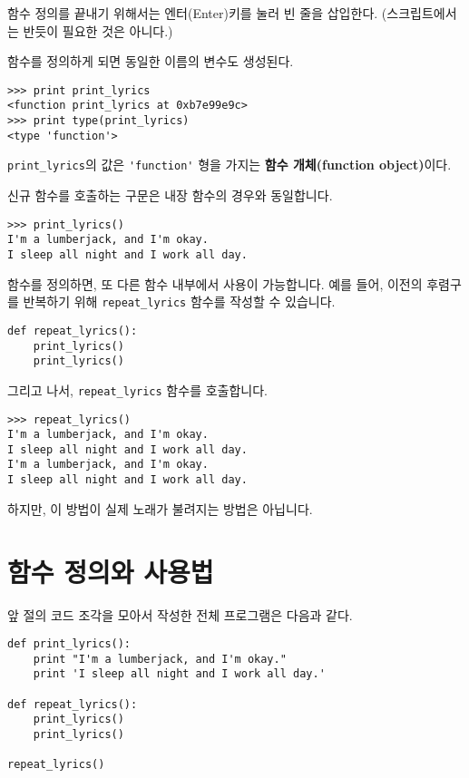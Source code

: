 함수 정의를 끝내기 위해서는 엔터(Enter)키를 눌러 빈 줄을 삽입한다. (스크립트에서는 반듯이 필요한 것은 아니다.) 

함수를 정의하게 되면 동일한 이름의 변수도 생성된다.

\beforeverb
\begin{verbatim}
>>> print print_lyrics
<function print_lyrics at 0xb7e99e9c>
>>> print type(print_lyrics)
<type 'function'>
\end{verbatim}
\afterverb
%

\verb"print_lyrics"의 값은 \verb"'function'" 형을 가지는 {\bf 함수 개체(function object)}이다. 

신규 함수를 호출하는 구문은 내장 함수의 경우와 동일합니다.

\beforeverb
\begin{verbatim}
>>> print_lyrics()
I'm a lumberjack, and I'm okay.
I sleep all night and I work all day.
\end{verbatim}
\afterverb
%

함수를 정의하면, 또 다른 함수 내부에서 사용이 가능합니다.
예를 들어, 이전의 후렴구를 반복하기 위해 \verb"repeat_lyrics" 함수를 작성할 수 있습니다.

\beforeverb
\begin{verbatim}
def repeat_lyrics():
    print_lyrics()
    print_lyrics()
\end{verbatim}
\afterverb
%

그리고 나서, \verb"repeat_lyrics" 함수를 호출합니다.

\beforeverb
\begin{verbatim}
>>> repeat_lyrics()
I'm a lumberjack, and I'm okay.
I sleep all night and I work all day.
I'm a lumberjack, and I'm okay.
I sleep all night and I work all day.
\end{verbatim}
\afterverb
%

하지만, 이 방법이 실제 노래가 불려지는 방법은 아닙니다.

\section{함수 정의와 사용법}

앞 절의 코드 조각을 모아서 작성한 전체 프로그램은 다음과 같다.

\beforeverb
\begin{verbatim}
def print_lyrics():
    print "I'm a lumberjack, and I'm okay."
    print 'I sleep all night and I work all day.'

def repeat_lyrics():
    print_lyrics()
    print_lyrics()

repeat_lyrics()
\end{verbatim}
\afterverb
%

